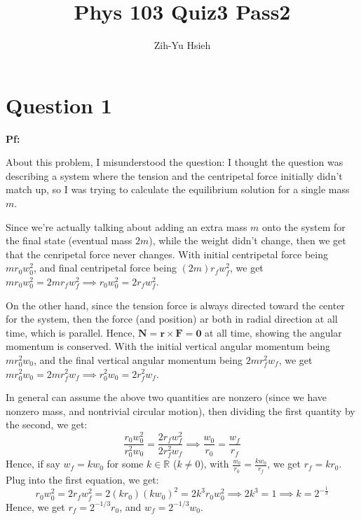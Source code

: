 \documentclass{article}
\title{Phys 103 Quiz3 Pass2}
\author{Zih-Yu Hsieh}
\newcommand{\RR}{\mathbb{R}}
\newcommand{\br}{\textbf{r}} %
\newcommand{\bF}{\textbf{F}} %
\newcommand{\bN}{\textbf{N}} %
\newcommand{\bzero}{\textbf{0}}
\begin{document}
\maketitle

\section*{Question 1}

\textbf{Pf:}

About this problem, I misunderstood the question: I thought the question was describing a system where the tension and the centripetal force initially didn't match up, so I was trying to calculate the equilibrium solution for a single mass $m$.

Since we're actually talking about adding an extra mass $m$ onto the system for the final state (eventual mass $2m$), while the weight didn't change, then we get that the cenripetal force never changes. With initial centripetal force being $m r_0w_0^2$, and final centripetal force being $(2m) r_fw_f^2$, we get $mr_0w_0^2=2mr_fw_f^2 \implies r_0w_0^2=2r_fw_f^2$.

On the other hand, since the tension force is always directed toward the center for the system, then the force (and position) ar both in radial direction at all time, which is parallel. Hence, $\bN = \br\times \bF = \bzero$ at all time, showing the angular momentum is conserved. With the initial vertical angular momentum being $mr_0^2w_0$, and the final vertical angular momentum being $2mr_f^2w_f$, we get $mr_0^2w_0=2mr_f^2w_f\implies r_0^2w_0=2r_f^2w_f$.

In general can assume the above two quantities are nonzero (since we have nonzero mass, and nontrivial circular motion), then dividing the first quantity by the second, we get:
$$\frac{r_0w_0^2}{r_0^2w_0}=\frac{2r_fw_f^2}{2r_f^2w_f}\implies \frac{w_0}{r_0}=\frac{w_f}{r_f}$$
Hence, if say $w_f=kw_0$ for some $k\in\RR$ ($k\neq 0$), with $\frac{w_0}{r_0}=\frac{kw_0}{r_f}$, we get $r_f=kr_0$. Plug into the first equation, we get:
$$r_0w_0^2 = 2r_fw_f^2 = 2(kr_0)(kw_0)^2 = 2k^3r_0w_0^2 \implies 2k^3 = 1\implies k=2^{-\frac{1}{3}}$$
Hence, we get $r_f = 2^{-1/3}r_0$, and $w_f=2^{-1/3}w_0$.

\break
\end{document}
